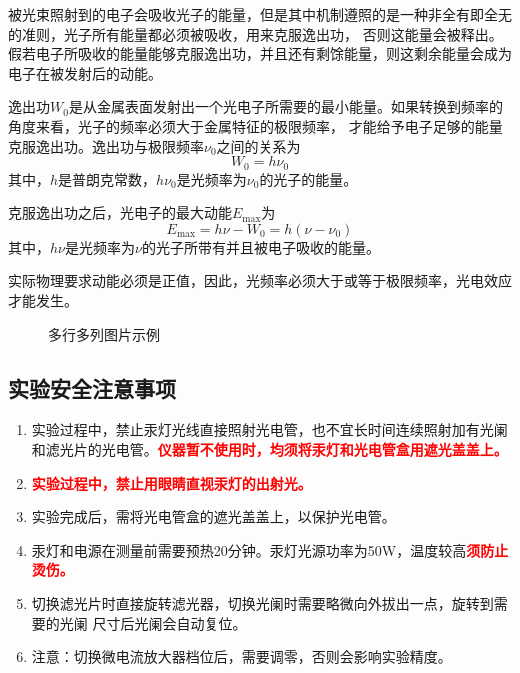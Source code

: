 \documentclass[dvipsnames, svgnames,a4paper,11pt]{article}
\begin{document}
被光束照射到的电子会吸收光子的能量，但是其中机制遵照的是一种非全有即全无的准则，光子所有能量都必须被吸收，用来克服逸出功，
否则这能量会被释出。假若电子所吸收的能量能够克服逸出功，并且还有剩馀能量，则这剩余能量会成为电子在被发射后的动能。

逸出功$W_0$是从金属表面发射出一个光电子所需要的最小能量。如果转换到频率的角度来看，光子的频率必须大于金属特征的极限频率，
才能给予电子足够的能量克服逸出功。逸出功与极限频率$\nu_0$之间的关系为
\begin{equation}
	W_0 = h\nu_0
\end{equation}
其中，$h$是普朗克常数，$h\nu_0$是光频率为$\nu_0$的光子的能量。

克服逸出功之后，光电子的最大动能$E_{\max}$为
\begin{equation}
	E_{\max} = h\nu - W_0 = h(\nu-\nu_0)
\end{equation}
其中，$h\nu$是光频率为$\nu$的光子所带有并且被电子吸收的能量。

实际物理要求动能必须是正值，因此，光频率必须大于或等于极限频率，光电效应才能发生。
\begin{figure}[htbp]
	\centering

	\caption{多行多列图片示例}
\end{figure}

\subsection{实验安全注意事项}
\begin{enumerate}
	\item 实验过程中，禁止汞灯光线直接照射光电管，也不宜长时间连续照射加有光阑和滤光片的光电管。\textcolor{red}{\textbf{仪器暂不使用时，均须将汞灯和光电管盒用遮光盖盖上。}}
	\item \textcolor{red}{\textbf{ 实验过程中，禁止用眼睛直视汞灯的出射光。}}
	\item 实验完成后，需将光电管盒的遮光盖盖上，以保护光电管。
	\item 汞灯和电源在测量前需要预热20分钟。汞灯光源功率为50W，温度较高\textcolor{red}{\textbf{须防止烫伤。}}
	\item 切换滤光片时直接旋转滤光器，切换光阑时需要略微向外拔出一点，旋转到需要的光阑
	尺寸后光阑会自动复位。
	\item 注意：切换微电流放大器档位后，需要调零，否则会影响实验精度。	
\end{enumerate}
\end{document}
